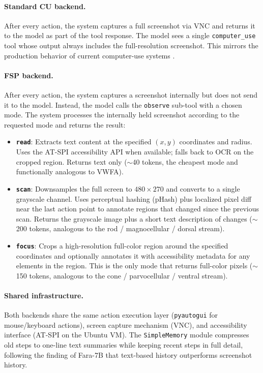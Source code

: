 \documentclass[11pt,a4paper]{article}
\begin{document}
\paragraph{Standard CU backend.}
After every action, the system captures a full screenshot via VNC and returns it to the model as part of the tool response. The model sees a single \texttt{computer\_use} tool whose output always includes the full-resolution screenshot. This mirrors the production behavior of current computer-use systems \cite{claude-computer-use, openai-operator}.

\paragraph{FSP backend.}
After every action, the system captures a screenshot internally but does not send it to the model. Instead, the model calls the \texttt{observe} sub-tool with a chosen mode. The system processes the internally held screenshot according to the requested mode and returns the result:

\begin{itemize}
    \item \textbf{\texttt{read}}: Extracts text content at the specified $(x, y)$ coordinates and radius. Uses the AT-SPI accessibility API when available; falls back to OCR on the cropped region. Returns text only ($\sim$40 tokens, the cheapest mode and functionally analogous to VWFA).
    \item \textbf{\texttt{scan}}: Downsamples the full screen to $480 \times 270$ and converts to a single grayscale channel. Uses perceptual hashing (pHash) plus localized pixel diff near the last action point to annotate regions that changed since the previous scan. Returns the grayscale image plus a short text description of changes ($\sim$200 tokens, analogous to the rod / magnocellular / dorsal stream).
    \item \textbf{\texttt{focus}}: Crops a high-resolution full-color region around the specified coordinates and optionally annotates it with accessibility metadata for any elements in the region. This is the only mode that returns full-color pixels ($\sim$150 tokens, analogous to the cone / parvocellular / ventral stream).
\end{itemize}

\paragraph{Shared infrastructure.}
Both backends share the same action execution layer (\texttt{pyautogui} for mouse/keyboard actions), screen capture mechanism (VNC), and accessibility interface (AT-SPI on the Ubuntu VM). The \texttt{SimpleMemory} module compresses old steps to one-line text summaries while keeping recent steps in full detail, following the finding of Fara-7B \cite{fara-7b} that text-based history outperforms screenshot history.
\end{document}
